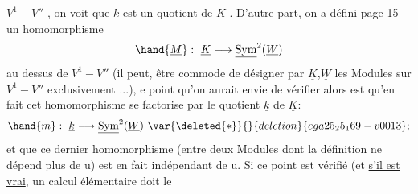 $V^1-V''$ , on voit  que $\underline{k}$ est un quotient de $\underline{K}$ . D'autre part, on a défini
page 15 un homomorphisme
\[ \hand{\underline{M}} : \ \underline{K}\longrightarrow\underline{\mathrm{Sym}}^2(\underline{W}) \]
au dessus de $V^1-V''$ (il peut, être commode de désigner par $\underline{K}$,$\underline{W}$ les Modules
sur $V^1-V''$ exclusivement ...),  e point qu'on aurait envie de vérifier
alors est qu'en fait cet homomorphisme se factorise par le quotient $\underline{k}$ de $\underline{K}$:
\[ \hand{m} : \ \underline{k}\longrightarrow\underline{\mathrm{Sym}}^2(\underline{W}) \ \var{\deleted{*}}{}{deletion}{ega25_25_169-v0013} ; \]
et que ce dernier homomorphisme (entre deux Modules dont la définition ne
 dépend plus de u) est en fait indépendant de
u. Si ce point est vérifié (et \uline{s'il est vrai}, un calcul élémentaire doit le

